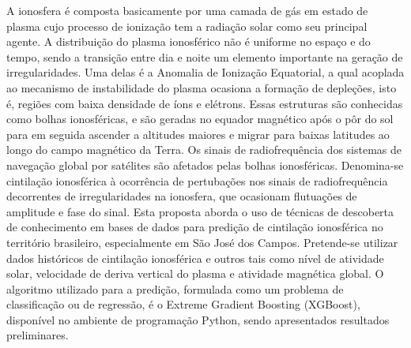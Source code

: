 
\begin{resumo}


\hypertarget{estilo:resumo}{} %

A ionosfera é composta basicamente por uma camada de gás em estado de plasma cujo  processo de ionização tem a radiação solar como seu principal agente. A distribuição do plasma ionosférico não é uniforme no espaço e do tempo, sendo a transição entre dia e noite  um elemento importante na geração de irregularidades.  Uma delas é a Anomalia de Ionização Equatorial, a qual acoplada ao mecanismo de instabilidade do plasma ocasiona a formação de depleções, isto é, regiões com baixa densidade de íons e elétrons. Essas estruturas são conhecidas como bolhas ionosféricas, e são geradas no equador magnético após o pôr do sol para em seguida ascender a altitudes maiores e migrar para baixas latitudes ao longo do campo magnético da Terra. Os sinais de radiofrequência dos sistemas de navegação global por satélites são afetados pelas bolhas ionosféricas. Denomina-se cintilação ionosférica à ocorrência de pertubações nos sinais de radiofrequência decorrentes de irregularidades na ionosfera, que ocasionam flutuações de amplitude e fase do sinal. Esta proposta aborda o uso de técnicas de descoberta de conhecimento em bases de dados para predição de cintilação ionosférica no território brasileiro, especialmente em São José dos Campos. Pretende-se utilizar dados históricos de cintilação ionosférica e outros tais como nível de atividade solar, velocidade de deriva vertical do plasma e atividade magnética global. O algoritmo utilizado para a predição, formulada como um problema de classificação ou de regressão, é o Extreme Gradient Boosting (XGBoost), disponível no ambiente de programação Python, sendo apresentados resultados preliminares.


\end{resumo}
